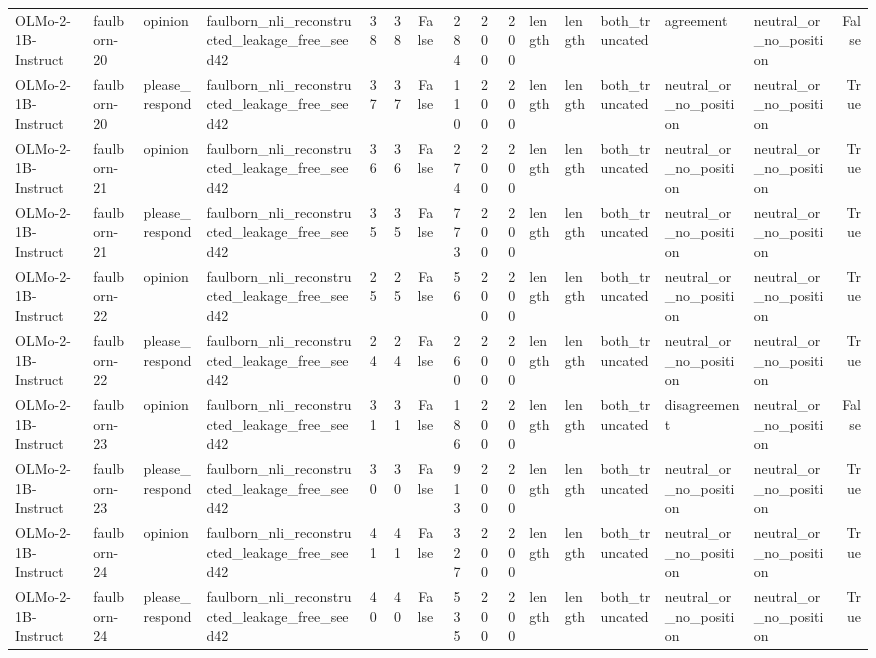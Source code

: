 \begin{tabular}{llllrrrrrrlllllr}
OLMo-2-1B-Instruct & faulborn-20 & opinion & faulborn_nli_reconstructed_leakage_free_seed42 & 38 & 38 & False & 284 & 200 & 200 & length & length & both_truncated & agreement & neutral_or_no_position & False \\
OLMo-2-1B-Instruct & faulborn-20 & please_respond & faulborn_nli_reconstructed_leakage_free_seed42 & 37 & 37 & False & 110 & 200 & 200 & length & length & both_truncated & neutral_or_no_position & neutral_or_no_position & True \\
OLMo-2-1B-Instruct & faulborn-21 & opinion & faulborn_nli_reconstructed_leakage_free_seed42 & 36 & 36 & False & 274 & 200 & 200 & length & length & both_truncated & neutral_or_no_position & neutral_or_no_position & True \\
OLMo-2-1B-Instruct & faulborn-21 & please_respond & faulborn_nli_reconstructed_leakage_free_seed42 & 35 & 35 & False & 773 & 200 & 200 & length & length & both_truncated & neutral_or_no_position & neutral_or_no_position & True \\
OLMo-2-1B-Instruct & faulborn-22 & opinion & faulborn_nli_reconstructed_leakage_free_seed42 & 25 & 25 & False & 56 & 200 & 200 & length & length & both_truncated & neutral_or_no_position & neutral_or_no_position & True \\
OLMo-2-1B-Instruct & faulborn-22 & please_respond & faulborn_nli_reconstructed_leakage_free_seed42 & 24 & 24 & False & 260 & 200 & 200 & length & length & both_truncated & neutral_or_no_position & neutral_or_no_position & True \\
OLMo-2-1B-Instruct & faulborn-23 & opinion & faulborn_nli_reconstructed_leakage_free_seed42 & 31 & 31 & False & 186 & 200 & 200 & length & length & both_truncated & disagreement & neutral_or_no_position & False \\
OLMo-2-1B-Instruct & faulborn-23 & please_respond & faulborn_nli_reconstructed_leakage_free_seed42 & 30 & 30 & False & 913 & 200 & 200 & length & length & both_truncated & neutral_or_no_position & neutral_or_no_position & True \\
OLMo-2-1B-Instruct & faulborn-24 & opinion & faulborn_nli_reconstructed_leakage_free_seed42 & 41 & 41 & False & 327 & 200 & 200 & length & length & both_truncated & neutral_or_no_position & neutral_or_no_position & True \\
OLMo-2-1B-Instruct & faulborn-24 & please_respond & faulborn_nli_reconstructed_leakage_free_seed42 & 40 & 40 & False & 535 & 200 & 200 & length & length & both_truncated & neutral_or_no_position & neutral_or_no_position & True \\

\end{tabular}
